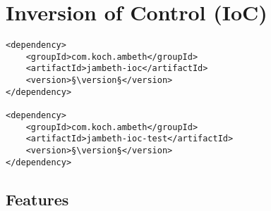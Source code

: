 \section{Inversion of Control (IoC)}
\label{module:IoC}
\ClearAPI
\TODO

\begin{lstlisting}[style=POM,caption={Maven modules to use \emph{Ambeth IoC}}]
<dependency>
	<groupId>com.koch.ambeth</groupId>
	<artifactId>jambeth-ioc</artifactId>
	<version>§\version§</version>
</dependency>

<dependency>
	<groupId>com.koch.ambeth</groupId>
	<artifactId>jambeth-ioc-test</artifactId>
	<version>§\version§</version>
</dependency>
\end{lstlisting}
\subsection{Features}
